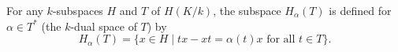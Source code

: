 For any $k$-subspaces $H$ and $T$ of $H(K/k)$, the subspace $H_\alpha(T)$ is defined for $\alpha \in T^*$ (the $k$-dual space of $T$) by
$$H_\alpha(T) = \{x \in H \mid tx - xt = \alpha(t)x \text{ for all } t \in T\}.$$
